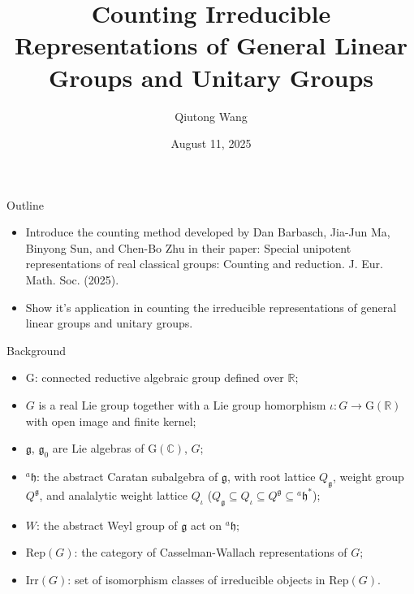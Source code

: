 \documentclass[fleqn,xcolor=dvipsnames]{beamer}
\title[]{Counting Irreducible Representations of General Linear Groups and Unitary Groups}
\author{Qiutong Wang}
\institute{Zhejiang University}
\date{August 11, 2025}
\newcommand{\BC}{{\mathbb {C}}}
\newcommand{\BR}{{\mathbb {R}}}
\newcommand{\RG}{{\mathrm {G}}}
\newcommand{\fg}{\mathfrak{g}}
\newcommand{\fh}{\mathfrak{h}}
\begin{document}
\begin{frame}
  \titlepage
\end{frame}




\begin{frame}{Outline}

\begin{itemize}
  \item Introduce the counting method developed by Dan Barbasch, Jia-Jun Ma, Binyong Sun, and Chen-Bo Zhu in their paper: Special unipotent representations of real classical groups: Counting and reduction. J. Eur. Math. Soc. (2025). 
  \item Show it's application in counting the irreducible representations of general linear groups and unitary groups.
\end{itemize}
\end{frame}












\begin{frame}{Background}
  \begin{itemize}
    \item $\RG$: connected reductive algebraic group defined over $\BR$;
    \item $G$ is a real Lie group together with a Lie group homorphism $\iota: G \to \RG(\BR)$ with open image and finite kernel;
    \item $\fg$, $\fg_0$ are Lie algebras of $\RG(\BC)$, $G$;
    \item $^{a}\fh$: the abstract Caratan subalgebra of $\fg$, with root lattice $Q_{\fg}$, weight group $Q^{\fg}$, and analalytic weight lattice $Q_{\iota}$ ($Q_{\fg} \subseteq Q_{\iota} \subseteq Q^{\fg} \subseteq {^{a}\fh}^*$);
    \item $W$: the abstract Weyl group of $\fg$ act on $^{a}\fh$;
    \item $\mathrm{Rep}(G)$: the category of Casselman-Wallach representations of $G$;
    \item $\mathrm{Irr}(G)$: set of isomorphism classes of irreducible objects in $\mathrm{Rep}(G)$.
  \end{itemize}
\end{frame}
\end{document}
